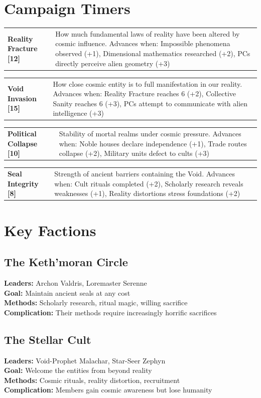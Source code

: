 \documentclass[12pt,twoside]{article}
\makeatletter
\newenvironment{timer}[2]{%
  \noindent
  \begin{tabularx}{\linewidth}{@{}>{\bfseries}l X@{}}
    #1 & #2
  \end{tabularx}\par
}{}
\makeatother
\begin{document}
\section{Campaign Timers}

\begin{timer}{Reality Fracture [12]}{How much fundamental laws of reality have been altered by cosmic influence. Advances when: Impossible phenomena observed (+1), Dimensional mathematics researched (+2), PCs directly perceive alien geometry (+3)}
\end{timer}

\begin{timer}{Void Invasion [15]}{How close cosmic entity is to full manifestation in our reality. Advances when: Reality Fracture reaches 6 (+2), Collective Sanity reaches 6 (+3), PCs attempt to communicate with alien intelligence (+3)}
\end{timer}

\begin{timer}{Political Collapse [10]}{Stability of mortal realms under cosmic pressure. Advances when: Noble houses declare independence (+1), Trade routes collapse (+2), Military units defect to cults (+3)}
\end{timer}

\begin{timer}{Seal Integrity [8]}{Strength of ancient barriers containing the Void. Advances when: Cult rituals completed (+2), Scholarly research reveals weaknesses (+1), Reality distortions stress foundations (+2)}
\end{timer}

\section{Key Factions}

\subsection{The Keth'moran Circle}
\textbf{Leaders:} Archon Valdris, Loremaster Serenne\\
\textbf{Goal:} Maintain ancient seals at any cost\\
\textbf{Methods:} Scholarly research, ritual magic, willing sacrifice\\
\textbf{Complication:} Their methods require increasingly horrific sacrifices

\subsection{The Stellar Cult}
\textbf{Leaders:} Void-Prophet Malachar, Star-Seer Zephyn\\
\textbf{Goal:} Welcome the entities from beyond reality\\
\textbf{Methods:} Cosmic rituals, reality distortion, recruitment\\
\textbf{Complication:} Members gain cosmic awareness but lose humanity
\end{document}
